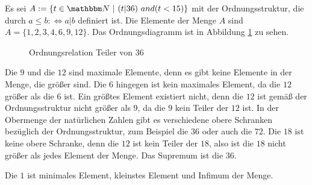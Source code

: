 \begin{Unit}[Beispiel]
  Es sei $A := \{t \in \mg{N}\ |\ (t|36)\ and (t < 15)\}$ mit der 
  Ordnungsstruktur, die durch $a \leq b :\Leftrightarrow a|b$ definiert ist. 
  Die Elemente der Menge $A$ sind $A = \{1, 2, 3, 4, 6, 9, 12\}$. Das 
  Ordnungsdiagramm ist in Abbildung 
  \ref{abb:rel:Ordnungsrelation Teiler von 36} zu sehen.

\begin{figure}[htbp]
\begin{center}
  \setlength{\unitlength}{1.0cm}
  \caption{Ordnungsrelation Teiler von 36}
  \label{abb:rel:Ordnungsrelation Teiler von 36}
\end{center}
\end{figure}

  Die $9$ und die $12$ sind maximale Elemente, denn es gibt keine Elemente in 
  der Menge, die größer sind. Die $6$ hingegen ist kein maximales Element, da 
  die $12$ größer als die $6$ ist. Ein größtes Element existiert nicht, denn die 
  $12$ ist gemäß der Ordnungsstruktur nicht größer als $9$, da die $9$ kein 
  Teiler der $12$ ist. In der Obermenge der natürlichen Zahlen gibt es 
  verschiedene obere Schranken bezüglich der Ordnungsstruktur, zum Beispiel die 
  $36$ oder auch die $72$. Die $18$ ist keine obere Schranke, denn die $12$ ist 
  kein Teiler der $18$, also ist die $18$ nicht größer als jedes Element der 
  Menge. Das Supremum ist die $36$.

  Die $1$ ist minimales Element, kleinstes Element und Infimum der Menge.
\end{Unit}
